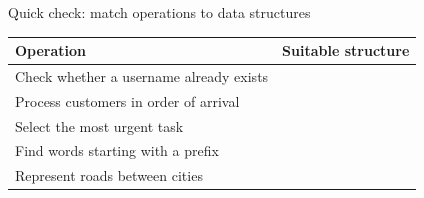 \documentclass[aspectratio=169]{beamer}
\begin{document}
\begin{frame}{Quick check: match operations to data structures}
  \scriptsize

  \begin{center}
    \renewcommand{\arraystretch}{1.35}
    \begin{tabular}{p{}p{}}
      \toprule
      \textbf{Operation} & \textbf{Suitable structure} \\
      \midrule
      Check whether a username already exists & \underline{\hspace{3.2cm}} \\
      Process customers in order of arrival & \underline{\hspace{3.2cm}} \\
      Select the most urgent task & \underline{\hspace{3.2cm}} \\
      Find words starting with a prefix & \underline{\hspace{3.2cm}} \\
      Represent roads between cities & \underline{\hspace{3.2cm}} \\
      \bottomrule
    \end{tabular}
  \end{center}

\end{frame}
\end{document}
